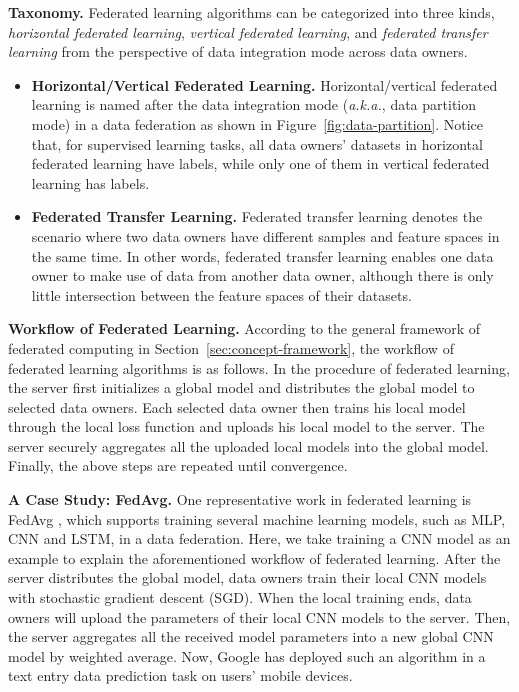 \documentclass[11pt]{article}
\newcommand{\aka}{\textit{a.k.a.},\xspace}
\newcommand\figref[1]{Figure~\ref{#1}}
\newcommand\secref[1]{Section~\ref{#1}}
\newcommand{\fakeparagraph}[1]{\vspace{1mm}\noindent\textbf{#1.}}
\begin{document}
\fakeparagraph{Taxonomy}
Federated learning algorithms can be categorized into three kinds,
\textit{horizontal federated learning}, \textit{vertical federated learning}, and \textit{federated transfer learning} \cite{Yongxin-DBLP:journals/tist/YangLCT19} from the perspective of data integration mode across data owners.

\begin{itemize}
    \item \textbf{Horizontal/Vertical Federated Learning.}
    Horizontal/vertical federated learning is named after the data integration mode (\aka data partition mode) in a data federation as shown in \figref{fig:data-partition}. Notice that, for supervised learning tasks, all data owners' datasets in horizontal federated learning have labels, while only one of them in vertical federated learning has labels.
    \item \textbf{Federated Transfer Learning.}
	Federated transfer learning denotes the scenario where two data owners have different samples and feature spaces in the same time. In other words, federated transfer learning enables one data owner to make use of data from another data owner, although there is only little intersection between the feature spaces of their datasets.
\end{itemize}

\fakeparagraph{Workflow of Federated Learning}
According to the general framework of federated computing in \secref{sec:concept-framework}, the workflow of federated learning algorithms is as follows.
In the procedure of federated learning, the server first initializes a global model and distributes the global model to selected data owners. Each selected data owner then trains his local model through the local loss function and uploads his local model to the server. The server securely aggregates all the uploaded local models into the global model. Finally, the above steps are repeated until convergence.

\fakeparagraph{A Case Study: \textsf{FedAvg}}
One representative work in federated learning is \textsf{FedAvg} \cite{Yongxin-DBLP:conf/aistats/McMahanMRHA17}, which supports training several machine learning models, such as MLP, CNN and LSTM, in a data federation.
Here, we take training a CNN model as an example to explain the aforementioned workflow of federated learning. After the server distributes the global model, data owners train their local CNN models with stochastic gradient descent (SGD).
When the local training ends, data owners will upload the parameters of their local CNN models to the server.
Then, the server aggregates all the received model parameters into a new global CNN model by weighted average.
Now, Google has deployed such an algorithm in a text entry data prediction task on users' mobile devices.
\end{document}
